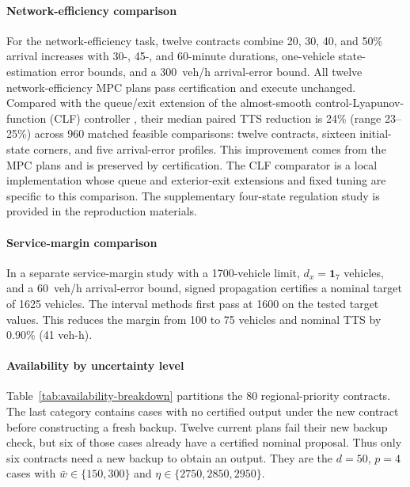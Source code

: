 \documentclass[preprint,12pt]{elsarticle}
\theoremstyle{definition}
\theoremstyle{plain}
\theoremstyle{definition}
\theoremstyle{plain}
\begin{document}
\paragraph{Network-efficiency comparison}
For the network-efficiency task, twelve contracts combine 20, 30, 40, and 50\% arrival
increases with 30-, 45-, and 60-minute durations, one-vehicle state-estimation error bounds, and a 300~veh/h arrival-error bound. All twelve network-efficiency
MPC plans pass certification and execute unchanged. Compared with the
queue/exit extension of the almost-smooth control-Lyapunov-function (CLF)
controller \cite{zhong2018robust}, their median paired
TTS reduction is 24\% (range 23--25\%) across 960 matched feasible
comparisons: twelve contracts, sixteen initial-state corners, and five
arrival-error profiles. This improvement comes from the MPC plans and is preserved by certification.
The CLF comparator is a local implementation whose queue and exterior-exit
extensions and fixed tuning are specific to this comparison. The supplementary four-state regulation
study is provided in the reproduction materials.

\paragraph{Service-margin comparison}
In a separate service-margin study with a 1700-vehicle limit,
$d_x=\mathbf1_7$ vehicles, and a 60~veh/h arrival-error bound, signed
propagation certifies a nominal target of 1625 vehicles. The interval
methods first pass at 1600 on the tested target values. This reduces the
margin from 100 to 75 vehicles and nominal TTS by 0.90\% (41 veh-h).

\paragraph{Availability by uncertainty level}
Table~\ref{tab:availability-breakdown} partitions the 80 regional-priority
contracts. The last category contains cases with no certified output
under the new contract before constructing a fresh backup. Twelve current
plans fail their new backup check, but six of those cases already have a
certified nominal proposal. Thus only six contracts need a new backup to
obtain an output. They are the $d=50$, $p=4$ cases with
$\bar w\in\{150,300\}$ and $\eta\in\{2750,2850,2950\}$.
\end{document}
